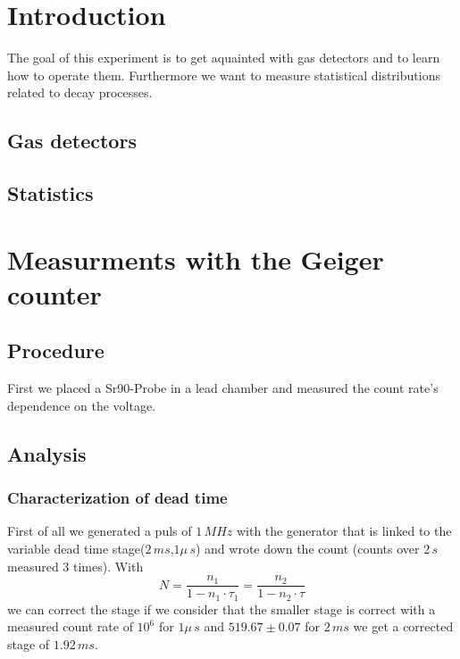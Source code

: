 \tableofcontents
\newpage
\listoffigures

\listoftables

\skippage

\setcounter{page}{1}
\restoregeometry
\thispagestyle{fancy}


\section{Introduction}

The goal of this experiment is to get aquainted with gas detectors and to learn how to operate them. Furthermore we want to measure statistical distributions related to decay processes.

\subsection{Gas detectors}

\subsection{Statistics}

\section{Measurments with the Geiger counter}

\subsection{Procedure}

First we placed a Sr90-Probe in a lead chamber and measured the count rate's dependence on the voltage. 

\subsection{Analysis}

\subsubsection{Characterization of dead time}

First of all we generated a puls of $1\,MHz$ with the generator
that is linked to the variable dead time stage($2\,ms$,$1\mu\,s$) and wrote down the count (counts over $2\,s$ measured $3$ times).
With
\begin{equation}
N =\frac{n_1}{1-n_1\cdot\tau_1}=\frac{n_2}{1-n_2\cdot\tau}
\end{equation}
we can correct the stage if we consider that the smaller stage is correct 
with a measured count rate of $10^6$ for $1\mu\,s$ and 
$519.67\pm0.07$ for $2\,ms$ we get a corrected stage of $1.92\,ms$.


